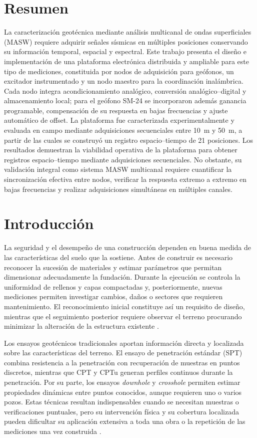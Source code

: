 
	\section*{Resumen}
	{\small La caracterización geotécnica mediante análisis multicanal de ondas superficiales (MASW) requiere adquirir señales sísmicas en múltiples posiciones conservando su información temporal, espacial y espectral. Este trabajo presenta el diseño e implementación de una plataforma electrónica distribuida y ampliable para este tipo de mediciones, constituida por nodos de adquisición para geófonos, un excitador instrumentado y un nodo maestro para la coordinación inalámbrica. Cada nodo integra acondicionamiento analógico, conversión analógico--digital y almacenamiento local; para el geófono SM-24 se incorporaron además ganancia programable, compensación de su respuesta en bajas frecuencias y ajuste automático de offset. La plataforma fue caracterizada experimentalmente y evaluada en campo mediante adquisiciones secuenciales entre \SI{10}{m} y \SI{50}{m}, a partir de las cuales se construyó un registro espacio--tiempo de 21 posiciones. Los resultados demuestran la viabilidad operativa de la plataforma para obtener registros espacio--tiempo mediante adquisiciones secuenciales. No obstante, su validación integral como sistema MASW multicanal requiere cuantificar la sincronización efectiva entre nodos, verificar la respuesta extremo a extremo en bajas frecuencias y realizar adquisiciones simultáneas en múltiples canales.\par}
	
	\section{Introducción}
	\label{sec:introduccion}
	
	La seguridad y el desempeño de una construcción dependen en buena medida de las características del suelo que la sostiene. Antes de construir es necesario reconocer la sucesión de materiales y estimar parámetros que permitan dimensionar adecuadamente la fundación. Durante la ejecución se controla la uniformidad de rellenos y capas compactadas y, posteriormente, nuevas mediciones permiten investigar cambios, daños o sectores que requieren mantenimiento. El reconocimiento inicial constituye así un requisito de diseño, mientras que el seguimiento posterior requiere observar el terreno procurando minimizar la alteración de la estructura existente \citep{FHWA2006,Park2018Roads}.
	
	Los ensayos geotécnicos tradicionales aportan información directa y localizada sobre las características del terreno. El ensayo de penetración estándar (SPT) combina resistencia a la penetración con recuperación de muestras en puntos discretos, mientras que CPT y CPTu generan perfiles continuos durante la penetración. Por su parte, los ensayos \emph{downhole} y \emph{crosshole} permiten estimar propiedades dinámicas entre puntos conocidos, aunque requieren uno o varios pozos. Estas técnicas resultan indispensables cuando se necesitan muestras o verificaciones puntuales, pero su intervención física y su cobertura localizada pueden dificultar su aplicación extensiva a toda una obra o la repetición de las mediciones una vez construida \citep{FHWA2006,Foti2014}.
	
